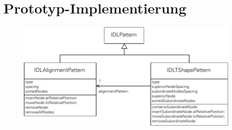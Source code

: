 
\chapter{Prototyp-Implementierung}
\label{chapter:prototype}

\begin{figure}[hbt]
    \centering
    \includegraphics[width=\textwidth]{resources/layout-patterns-implementation}
    \caption{}
    \label{fig:layout-patterns-implementation}
\end{figure}










